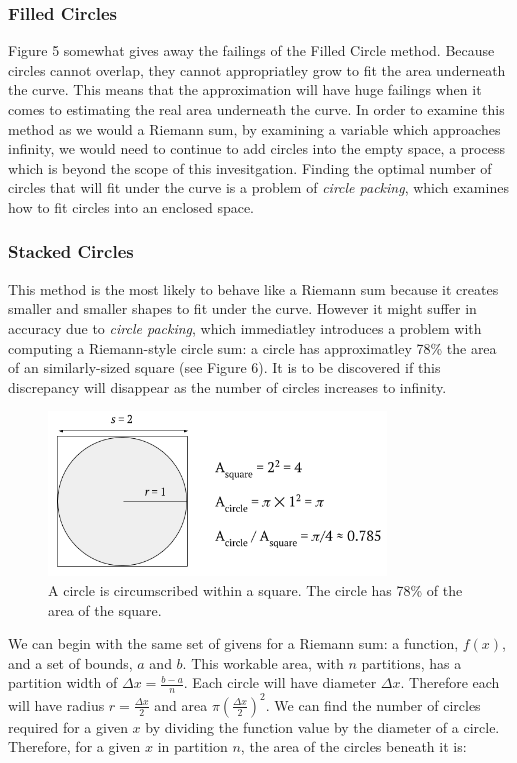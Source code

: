 \documentclass{article}
\begin{document}
      \subsubsection{Filled Circles}
        Figure 5 somewhat gives away the failings of the Filled Circle method. Because circles cannot overlap, they cannot appropriatley grow to fit the area underneath the curve. This means that the approximation will have huge failings when it comes to estimating the real area underneath the curve. In order to examine this method as we would a Riemann sum, by examining a variable which approaches infinity, we would need to continue to add circles into the empty space, a process which is beyond the scope of this invesitgation. Finding the optimal number of circles that will fit under the curve is a problem of \emph{circle packing}, which examines how to fit circles into an enclosed space.

      \subsubsection{Stacked Circles}
        This method is the most likely to behave like a Riemann sum because it creates smaller and smaller shapes to fit under the curve. However it might suffer in accuracy due to \emph{circle packing}, which immediatley introduces a problem with computing a Riemann-style circle sum: a circle has approximatley 78\% the area of an similarly-sized square (see Figure 6). It is to be discovered if this discrepancy will disappear as the number of circles increases to infinity.

        \begin{figure}[h]
          \centering
          \includegraphics[width=0.8\textwidth]{circle_packing}
          \caption{A circle is circumscribed within a square. The circle has 78\% of the area of the square.}
        \end{figure}

        We can begin with the same set of givens for a Riemann sum: a function, \( f(x) \), and a set of bounds, \( a \) and \( b \). This workable area, with \( n \) partitions, has a partition width of \( \Delta x = \frac{b-a}{n} \). Each circle will have diameter \( \Delta x \). Therefore each will have radius \( r = \frac{\Delta x}{2} \) and area \( \pi \left(\frac{\Delta x}{2}\right)^2 \). We can find the number of circles required for a given \( x \) by dividing the function value by the diameter of a circle. Therefore, for a given \( x \) in partition \( n \), the area of the circles beneath it is:
\end{document}
